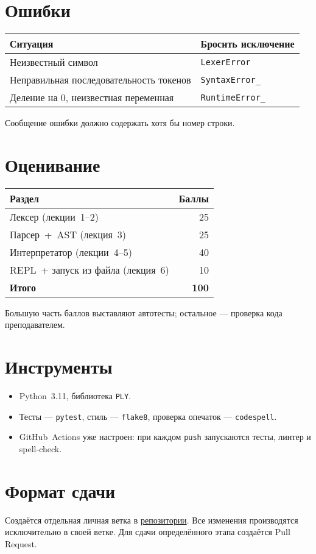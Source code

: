 \documentclass[12pt]{article}
\begin{document}
\section{Ошибки}
\begin{tabular}{ll}
	\toprule
	Ситуация                                & Бросить исключение      \\ \midrule
	Неизвестный символ                      & \texttt{LexerError}     \\
	Неправильная последовательность токенов & \texttt{SyntaxError\_}  \\
	Деление на 0, неизвестная переменная    & \texttt{RuntimeError\_} \\ \bottomrule
\end{tabular}

Сообщение ошибки должно содержать хотя бы номер строки.

\section{Оценивание}
\begin{tabular}{lr}
	\toprule
	Раздел                            & Баллы        \\ \midrule
	Лексер (лекции 1–2)               & 25           \\
	Парсер + AST (лекция 3)           & 25           \\
	Интерпретатор (лекции 4–5)        & 40           \\
	REPL + запуск из файла (лекция 6) & 10           \\
	\textbf{Итого}                    & \textbf{100} \\ \bottomrule
\end{tabular}

Большую часть баллов выставляют автотесты; остальное — проверка кода преподавателем.

\section{Инструменты}
\begin{itemize}
	\item Python 3.11, библиотека \texttt{PLY}.
	\item Тесты — \texttt{pytest}, стиль — \texttt{flake8}, проверка опечаток — \texttt{codespell}.
	\item GitHub Actions уже настроен: при каждом \texttt{push} запускаются тесты, линтер и spell‑check.
\end{itemize}

\section{Формат сдачи}
Создаётся отдельная личная ветка в \href{https://github.com/LumbaBalumba/tinypy}{репозитории}. Все изменения производятся исключительно в своей ветке. Для сдачи определённого этапа создаётся Pull Request.
\end{document}
